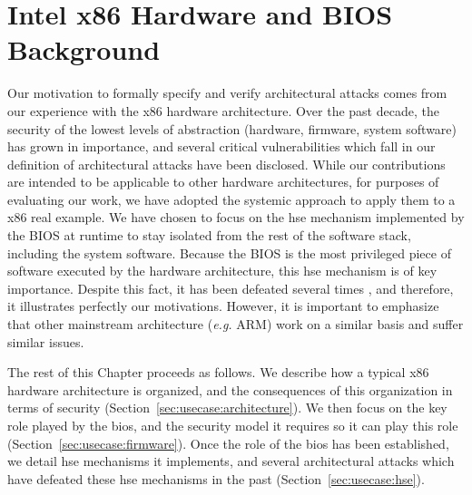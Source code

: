 \chapter{Intel x86 Hardware and BIOS Background}
\label{chapter:usecase}


\vspace{1cm}\noindent
%
Our motivation to formally specify and verify architectural attacks comes from
our experience with the x86 hardware architecture.
%
%
Over the past decade, the security of the lowest levels of abstraction
(hardware, firmware, system software) has grown in importance, and several
critical vulnerabilities which fall in our definition of architectural attacks
have been disclosed.
%
%
While our contributions are intended to be applicable to other hardware
architectures, for purposes of evaluating our work, we have adopted the systemic
approach to apply them to a x86 real example.
%
%
We have chosen to focus on the \ac{hse} mechanism implemented by the BIOS at
runtime to stay isolated from the rest of the software stack, including the
system software.
%
Because the BIOS is the most privileged piece of software executed by the
hardware architecture, this \ac{hse} mechanism is of key importance.
%
Despite this fact, it has been defeated several times , and
therefore, it illustrates perfectly our motivations.
%
However, it is important to emphasize that other mainstream architecture
(\emph{e.g.}  ARM) work on a similar basis and suffer similar issues.

The rest of this Chapter proceeds as follows.
%
We describe how a typical x86 hardware architecture is organized, and the
consequences of this organization in terms of security
(Section~\ref{sec:usecase:architecture}).
%
We then focus on the key role played by the \ac{bios}, and the security model it
requires so it can play this role (Section~\ref{sec:usecase:firmware}).
%
Once the role of the \ac{bios} has been established, we detail \ac{hse}
mechanisms it implements, and several architectural attacks which have defeated
these \ac{hse} mechanisms in the past (Section~\ref{sec:usecase:hse}).

